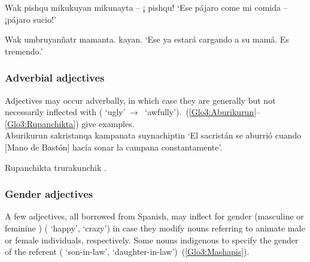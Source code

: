 %
{Wak pishqu mikukuyan mikunayta -- ¡ pishqu!}%
{}%
{‘Ese pájaro come mi comida -- ¡pájaro sucio!’}%
{}{}%

%
{Wak umbruyanñatr mamanta.  kayan.}%
{}%
{‘Ese ya estará cargando a su mamá. Es tremendo.’}%
{}{}%

\subsubsection{Adverbial adjectives}
Adjectives may occur adverbally, in which case they are generally but not necessarily inflected with  ( ‘ugly’~→~ ‘awfully’).~(\ref{Glo3:Aburikurun}--\ref{Glo3:Rupanchikta}) give examples.\\

%
{Aburikurun sakristanqa  kampanata suynachiptin}%
{}%
{‘El sacristán se aburrió cuando [Mano de Bastón] hacía sonar la campana constantamente’.}%
{}{}%

%
{Rupanchikta trurakunchik .}%
{}%
{}{}%

\subsubsection{Gender adjectives}
A few adjectives, all borrowed from Spanish, may inflect for gender (masculine  or feminine ) ( ‘happy’,  ‘crazy’) in case they modify nouns referring to animate male or female individuals, respectively. Some nouns indigenous to \SYQ{} specify the gender of the referent ( ‘son-in-law’,  ‘daughter-in-law’)~(\ref{Glo3:Mashapis}).\\

